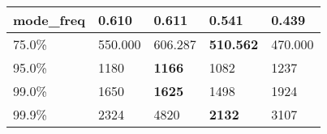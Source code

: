 \begin{table}[H]
\begin{tabular}{|l|m{10em}|m{10em}|m{10em}|m{10em}|}
\hline mode\_freq & 0.610 & \bfseries 0.611 & 0.541 & \cellcolor[rgb]{0.9, 0.54, 0.52} 0.439 \\
\hline 75.0\% & 550.000 & 606.287 & \bfseries 510.562 & \cellcolor[rgb]{0.9, 0.54, 0.52} 470.000 \\
\hline 95.0\% & 1180 & \bfseries 1166 & \cellcolor[rgb]{0.9, 0.54, 0.52} 1082 & 1237 \\
\hline 99.0\% & 1650 & \bfseries 1625 & 1498 & \cellcolor[rgb]{0.9, 0.54, 0.52} 1924 \\
\hline 99.9\% & 2324 & \cellcolor[rgb]{0.9, 0.54, 0.52} 4820 & \bfseries 2132 & 3107 \\
\hline
\end{tabular}
\end{table}
